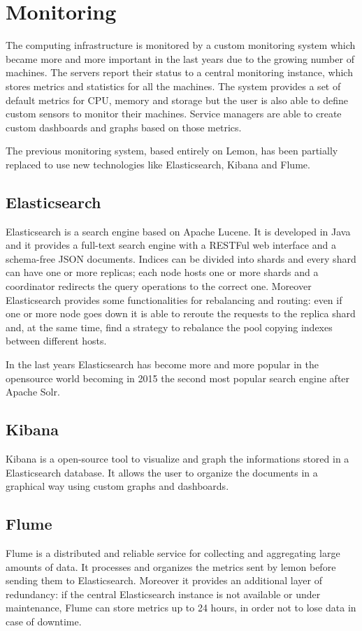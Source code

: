 \section{Monitoring}

The computing infrastructure is monitored by a custom monitoring system
which became more and more important in the last years due to the growing
number of machines. The servers report their status to a central
monitoring instance, which stores metrics and statistics for all the
machines. The system provides a set of default metrics for CPU, memory and
storage but the user is also able to define custom sensors to monitor
their machines. Service managers are able to create custom dashboards and
graphs based on those metrics.

The previous monitoring system, based entirely on Lemon, has been
partially replaced to use new technologies like Elasticsearch, Kibana and
Flume. 

\subsection{Elasticsearch}

Elasticsearch is a search engine based on Apache Lucene. It is developed
in Java and it provides a full-text search engine with a RESTFul web
interface and a schema-free JSON documents. Indices can be divided into
shards and every shard can have one or more replicas; each node hosts one
or more shards and a coordinator redirects the query operations to the
correct one. Moreover Elasticsearch provides some functionalities for
rebalancing and routing: even if one or more node goes down it is able to
reroute the requests to the replica shard and, at the same time, find
a strategy to rebalance the pool copying indexes between different
hosts.

In the last years Elasticsearch has become more and more popular in the
opensource world becoming in 2015 the second most popular search engine
after Apache Solr.

\subsection{Kibana}

Kibana is a open-source tool to visualize and graph the informations
stored in a Elasticsearch database. It allows the user to organize the
documents in a graphical way using custom graphs and dashboards. 

\subsection{Flume}

Flume is a distributed and reliable service for collecting and aggregating
large amounts of data. It processes and organizes the metrics sent by
lemon before sending them to Elasticsearch. Moreover it provides an
additional layer of redundancy: if the central Elasticsearch instance is
not available or under maintenance, Flume can store metrics up to 24
hours, in order not to lose data in case of downtime.


